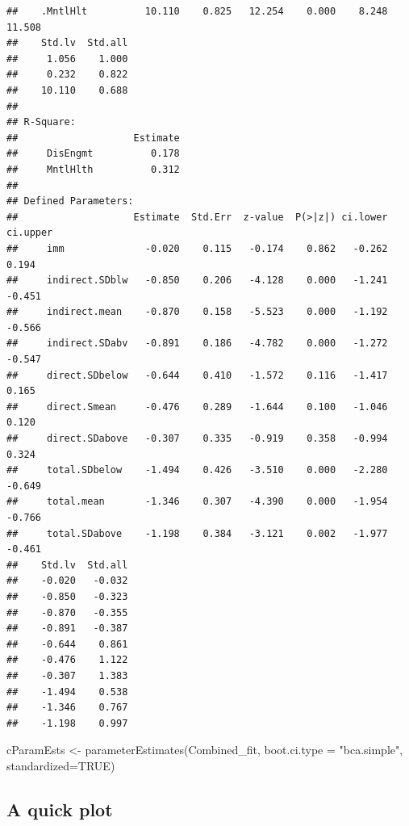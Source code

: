 \documentclass[
  english,
]{book}
\newenvironment{Shaded}{\begin{snugshade}}{\end{snugshade}}
\newcommand{\AttributeTok}[1]{\textcolor[rgb]{0.77,0.63,0.00}{#1}}
\newcommand{\ConstantTok}[1]{\textcolor[rgb]{0.00,0.00,0.00}{#1}}
\newcommand{\FunctionTok}[1]{\textcolor[rgb]{0.00,0.00,0.00}{#1}}
\newcommand{\NormalTok}[1]{#1}
\newcommand{\OtherTok}[1]{\textcolor[rgb]{0.56,0.35,0.01}{#1}}
\newcommand{\StringTok}[1]{\textcolor[rgb]{0.31,0.60,0.02}{#1}}
\begin{document}
\begin{verbatim}
##    .MntlHlt          10.110    0.825   12.254    0.000    8.248   11.508
##    Std.lv  Std.all
##     1.056    1.000
##     0.232    0.822
##    10.110    0.688
## 
## R-Square:
##                    Estimate
##     DisEngmt          0.178
##     MntlHlth          0.312
## 
## Defined Parameters:
##                    Estimate  Std.Err  z-value  P(>|z|) ci.lower ci.upper
##     imm              -0.020    0.115   -0.174    0.862   -0.262    0.194
##     indirect.SDblw   -0.850    0.206   -4.128    0.000   -1.241   -0.451
##     indirect.mean    -0.870    0.158   -5.523    0.000   -1.192   -0.566
##     indirect.SDabv   -0.891    0.186   -4.782    0.000   -1.272   -0.547
##     direct.SDbelow   -0.644    0.410   -1.572    0.116   -1.417    0.165
##     direct.Smean     -0.476    0.289   -1.644    0.100   -1.046    0.120
##     direct.SDabove   -0.307    0.335   -0.919    0.358   -0.994    0.324
##     total.SDbelow    -1.494    0.426   -3.510    0.000   -2.280   -0.649
##     total.mean       -1.346    0.307   -4.390    0.000   -1.954   -0.766
##     total.SDabove    -1.198    0.384   -3.121    0.002   -1.977   -0.461
##    Std.lv  Std.all
##    -0.020   -0.032
##    -0.850   -0.323
##    -0.870   -0.355
##    -0.891   -0.387
##    -0.644    0.861
##    -0.476    1.122
##    -0.307    1.383
##    -1.494    0.538
##    -1.346    0.767
##    -1.198    0.997
\end{verbatim}

\begin{Shaded}
\begin{Highlighting}[]
\NormalTok{cParamEsts }\OtherTok{\textless{}{-}} \FunctionTok{parameterEstimates}\NormalTok{(Combined\_fit, }\AttributeTok{boot.ci.type =} \StringTok{"bca.simple"}\NormalTok{, }\AttributeTok{standardized=}\ConstantTok{TRUE}\NormalTok{)}
\end{Highlighting}
\end{Shaded}

\hypertarget{a-quick-plot}{%
\subsection{A quick plot}\label{a-quick-plot}}
\end{document}
